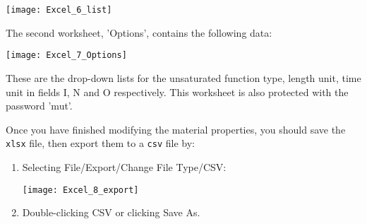    \texttt{[image: Excel\_6\_list]}
   
The second worksheet, 'Options', contains the following data:   

   \texttt{[image: Excel\_7\_Options]}
   
These are the drop-down lists for the unsaturated function type, length unit, time unit in fields I, N and O respectively.  This worksheet is also protected with the password 'mut'.

Once you have finished modifying the material properties, you should save the \texttt{xlsx} file, then export them to a \texttt{csv} file by:
\begin{enumerate}
    \item Selecting File/Export/Change File Type/CSV:

   \texttt{[image: Excel\_8\_export]}
   
   \item  Double-clicking CSV or clicking Save As.
\end{enumerate}

    
   
        
        
 